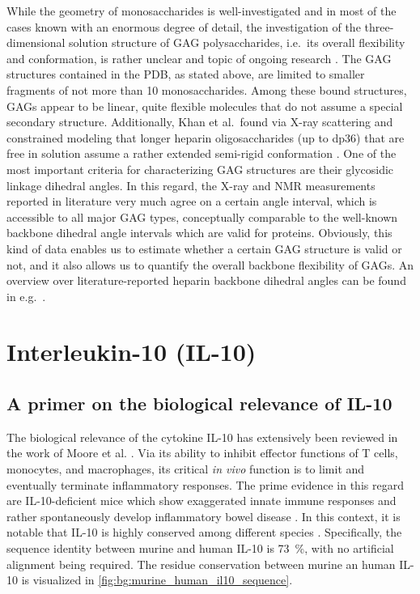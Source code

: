 While the geometry of monosaccharides is well-investigated and in most of the
cases known with an enormous degree of detail, the investigation of the
three-dimensional solution structure of GAG polysaccharides, i.e.\ its overall
flexibility and conformation, is rather unclear and topic of ongoing research
\cite{structure_gags_progess_perspectives_2010}. The GAG structures contained in
the PDB, as stated above, are limited to smaller fragments of not more than 10
monosaccharides. Among these bound structures, GAGs appear to be linear, quite
flexible molecules that do not assume a special secondary structure.
Additionally, Khan et al.\ found via X-ray scattering and constrained modeling
that longer heparin oligosaccharides (up to dp36) that are free in solution
assume a rather extended semi-rigid conformation
\cite{semi_rigid_heparin_structures_2010}. One of the most important criteria
for characterizing GAG structures are their glycosidic linkage dihedral angles.
In this regard, the X-ray and NMR measurements reported in literature very much
agree on a certain angle interval, which is accessible to all major GAG types,
conceptually comparable to the well-known backbone dihedral angle intervals
which are valid for proteins. Obviously, this kind of data enables us to
estimate whether a certain GAG structure is valid or not, and it also allows us
to quantify the overall backbone flexibility of GAGs. An overview over
literature-reported heparin backbone dihedral angles can be found in e.g.\
\cite{semi_rigid_heparin_structures_2010}.


\section{Interleukin-10 (IL-10)}

\subsection{A primer on the biological relevance of IL-10}

The biological relevance of the cytokine IL-10 has extensively been reviewed in
the work of Moore et al. \cite{moore_2001}. Via its ability to inhibit effector
functions of T cells, monocytes, and macrophages, its critical
\textit{in vivo} function is to limit and eventually terminate inflammatory
responses. The prime evidence in this regard are IL-10-deficient mice which show
exaggerated innate immune responses and rather spontaneously develop
inflammatory bowel disease \cite{mueller_il10defmouse_1993,
roers_il10_mice_2004,rubtsov_il10_mice_2008}. In this context, it is notable
that IL-10 is highly conserved among different species
\cite{il10_dna_rabiit_2000, porcine_il10_1995}. Specifically, the sequence
identity between murine and human IL-10 is \SI{73}{\percent}, with no artificial
alignment being required. The residue conservation between murine an human IL-10
is visualized in
\cref{fig:bg:murine_human_il10_sequence}.

